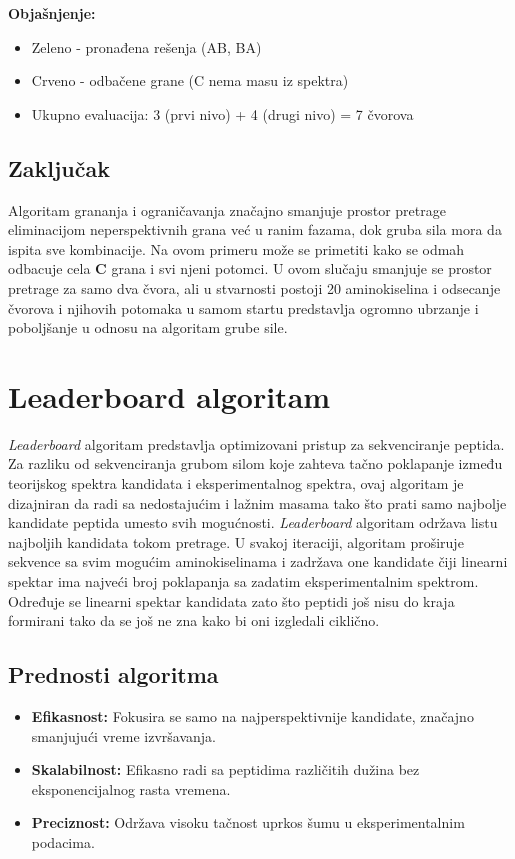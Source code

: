 \documentclass[12pt,oneside]{memoir}
\begin{document}
\textbf{Objašnjenje:}
\begin{itemize}
    \item \textcolor{green!50!black}{Zeleno} - pronađena rešenja (AB, BA)
    \item \textcolor{red!50!black}{Crveno} - odbačene grane (C nema masu iz spektra)
    \item Ukupno evaluacija: 3 (prvi nivo) + 4 (drugi nivo) = 7 čvorova
\end{itemize}

\subsection{Zaključak}

Algoritam grananja i ograničavanja značajno smanjuje prostor pretrage eliminacijom neperspektivnih grana već u ranim fazama, dok gruba sila mora da ispita sve kombinacije.
Na ovom primeru može se primetiti kako se odmah odbacuje cela \textbf{C} grana i svi njeni potomci. U ovom slučaju smanjuje se prostor pretrage za samo dva čvora, ali u stvarnosti postoji 20 aminokiselina i odsecanje čvorova i njihovih potomaka u samom startu predstavlja ogromno ubrzanje i poboljšanje u odnosu na algoritam grube sile.

\section{Leaderboard algoritam}
\emph{Leaderboard} algoritam \cite{online_lecture, online_book} predstavlja optimizovani pristup za sekvenciranje peptida. Za razliku od sekvenciranja grubom silom koje zahteva tačno poklapanje između teorijskog spektra kandidata i eksperimentalnog spektra, ovaj algoritam je dizajniran da radi sa nedostajućim i lažnim masama tako što prati samo najbolje kandidate peptida umesto svih mogućnosti.
\emph{Leaderboard} algoritam održava listu najboljih kandidata tokom pretrage. U svakoj iteraciji, algoritam proširuje sekvence sa svim mogućim aminokiselinama i zadržava one kandidate čiji linearni spektar ima najveći broj poklapanja sa zadatim eksperimentalnim spektrom.
Određuje se linearni spektar kandidata zato što peptidi još nisu do kraja formirani tako da se još ne zna kako bi oni izgledali ciklično.

\subsection{Prednosti algoritma}

\begin{itemize}
    \item \textbf{Efikasnost:} Fokusira se samo na najperspektivnije kandidate, značajno smanjujući vreme izvršavanja.
    \item \textbf{Skalabilnost:} Efikasno radi sa peptidima različitih dužina bez eksponencijalnog rasta vremena.
    \item \textbf{Preciznost:} Održava visoku tačnost uprkos šumu u eksperimentalnim podacima.
\end{itemize}
\end{document}
